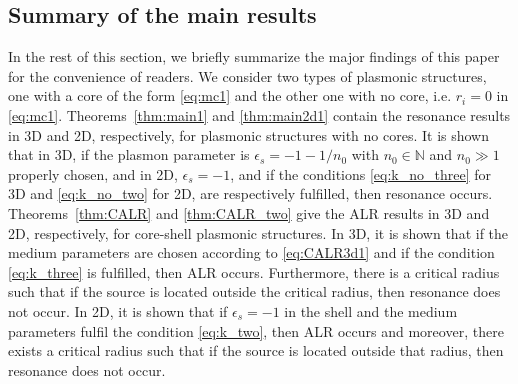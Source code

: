 \documentclass[11pt,reqno,twoside]{amsart}
\theoremstyle{definition}
\theoremstyle{remark}
\numberwithin{equation}{section}
\begin{document}

\subsection{Summary of the main results}

In the rest of this section, we briefly summarize the major findings of this paper for the convenience of readers. We consider two types of plasmonic structures, one with a core of the form \eqref{eq:mc1} and the other one with no core, i.e. $r_i=0$ in \eqref{eq:mc1}. Theorems~\ref{thm:main1} and \ref{thm:main2d1} contain the resonance results in 3D and 2D, respectively, for plasmonic structures with no cores. It is shown that in 3D, if the plasmon parameter is $\epsilon_s=-1-1/n_0$ with $n_0\in\mathbb{N}$ and $n_0\gg 1$ properly chosen, and in 2D, $\epsilon_s=-1$, and if the conditions \eqref{eq:k_no_three} for 3D and \eqref{eq:k_no_two} for 2D, are respectively fulfilled, then resonance occurs. Theorems~\ref{thm:CALR} and \ref{thm:CALR_two} give the ALR results in 3D and 2D, respectively, for core-shell plasmonic structures. In 3D, it is shown that if the medium parameters are chosen according to \eqref{eq:CALR3d1} and if the condition \eqref{eq:k_three} is fulfilled, then ALR occurs. Furthermore, there is a critical radius such that if the source is located outside the critical radius, then resonance does not occur. In 2D, it is shown that if $\epsilon_s=-1$ in the shell and the medium parameters fulfil the condition \eqref{eq:k_two}, then ALR occurs and moreover, there exists a critical radius such that if the source is located outside that radius, then resonance does not occur. 
\end{document}
